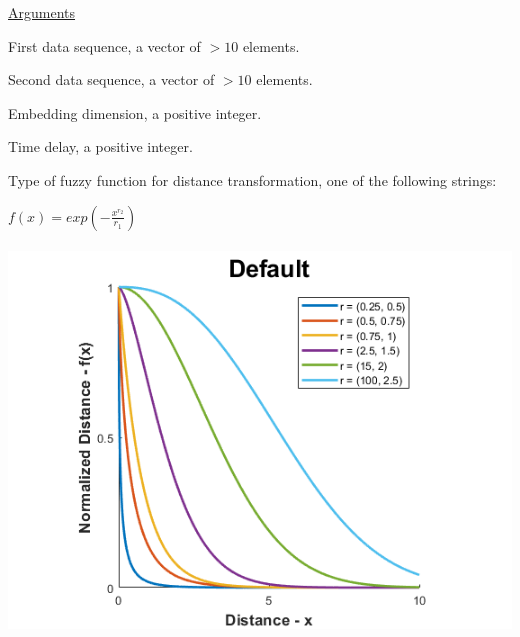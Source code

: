 \documentclass[12pt, a4paper, titlepage, openany]{book}
\begin{document}
\noindent \ul{Arguments}
\begin{description}[labelsep=1cm, labelwidth=2cm, nosep,style=multiline,leftmargin=3cm]\footnotesize
\item[\texttt{Sig1}]	First data sequence, a vector of $>10$ elements.
\item[\texttt{Sig2}]	Second data sequence, a vector of $>10$ elements.
\item[\texttt{m}]		Embedding dimension, a positive integer.
\item[\texttt{tau}]		Time delay, a positive integer.
\item[\texttt{Fx}]		Type of fuzzy function for distance transformation, one of the following strings:
	\begin{description}[labelsep=14em, labelwidth=10em, nosep,style=multiline,leftmargin=6cm]
	\item[\texttt{"default"}]	$f(x) = exp(-\frac{x^{r_2}}{r_1})$\\ \ \\
		\includegraphics[scale=.5]{Fuzz1v1.png} \\
		 

\end{description}
\end{description}
\end{document}
